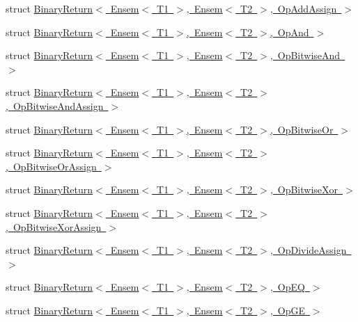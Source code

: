\begin{DoxyCompactItemize}
\item 
struct \mbox{\hyperlink{structENSEM_1_1BinaryReturn_3_01Ensem_3_01T1_01_4_00_01Ensem_3_01T2_01_4_00_01OpAddAssign_01_4}{Binary\+Return$<$ Ensem$<$ T1 $>$, Ensem$<$ T2 $>$, Op\+Add\+Assign $>$}}
\item 
struct \mbox{\hyperlink{structENSEM_1_1BinaryReturn_3_01Ensem_3_01T1_01_4_00_01Ensem_3_01T2_01_4_00_01OpAnd_01_4}{Binary\+Return$<$ Ensem$<$ T1 $>$, Ensem$<$ T2 $>$, Op\+And $>$}}
\item 
struct \mbox{\hyperlink{structENSEM_1_1BinaryReturn_3_01Ensem_3_01T1_01_4_00_01Ensem_3_01T2_01_4_00_01OpBitwiseAnd_01_4}{Binary\+Return$<$ Ensem$<$ T1 $>$, Ensem$<$ T2 $>$, Op\+Bitwise\+And $>$}}
\item 
struct \mbox{\hyperlink{structENSEM_1_1BinaryReturn_3_01Ensem_3_01T1_01_4_00_01Ensem_3_01T2_01_4_00_01OpBitwiseAndAssign_01_4}{Binary\+Return$<$ Ensem$<$ T1 $>$, Ensem$<$ T2 $>$, Op\+Bitwise\+And\+Assign $>$}}
\item 
struct \mbox{\hyperlink{structENSEM_1_1BinaryReturn_3_01Ensem_3_01T1_01_4_00_01Ensem_3_01T2_01_4_00_01OpBitwiseOr_01_4}{Binary\+Return$<$ Ensem$<$ T1 $>$, Ensem$<$ T2 $>$, Op\+Bitwise\+Or $>$}}
\item 
struct \mbox{\hyperlink{structENSEM_1_1BinaryReturn_3_01Ensem_3_01T1_01_4_00_01Ensem_3_01T2_01_4_00_01OpBitwiseOrAssign_01_4}{Binary\+Return$<$ Ensem$<$ T1 $>$, Ensem$<$ T2 $>$, Op\+Bitwise\+Or\+Assign $>$}}
\item 
struct \mbox{\hyperlink{structENSEM_1_1BinaryReturn_3_01Ensem_3_01T1_01_4_00_01Ensem_3_01T2_01_4_00_01OpBitwiseXor_01_4}{Binary\+Return$<$ Ensem$<$ T1 $>$, Ensem$<$ T2 $>$, Op\+Bitwise\+Xor $>$}}
\item 
struct \mbox{\hyperlink{structENSEM_1_1BinaryReturn_3_01Ensem_3_01T1_01_4_00_01Ensem_3_01T2_01_4_00_01OpBitwiseXorAssign_01_4}{Binary\+Return$<$ Ensem$<$ T1 $>$, Ensem$<$ T2 $>$, Op\+Bitwise\+Xor\+Assign $>$}}
\item 
struct \mbox{\hyperlink{structENSEM_1_1BinaryReturn_3_01Ensem_3_01T1_01_4_00_01Ensem_3_01T2_01_4_00_01OpDivideAssign_01_4}{Binary\+Return$<$ Ensem$<$ T1 $>$, Ensem$<$ T2 $>$, Op\+Divide\+Assign $>$}}
\item 
struct \mbox{\hyperlink{structENSEM_1_1BinaryReturn_3_01Ensem_3_01T1_01_4_00_01Ensem_3_01T2_01_4_00_01OpEQ_01_4}{Binary\+Return$<$ Ensem$<$ T1 $>$, Ensem$<$ T2 $>$, Op\+E\+Q $>$}}
\item 
struct \mbox{\hyperlink{structENSEM_1_1BinaryReturn_3_01Ensem_3_01T1_01_4_00_01Ensem_3_01T2_01_4_00_01OpGE_01_4}{Binary\+Return$<$ Ensem$<$ T1 $>$, Ensem$<$ T2 $>$, Op\+G\+E $>$}}

\end{DoxyCompactItemize}
